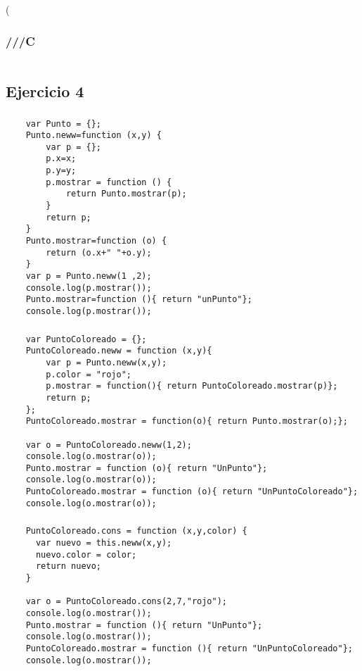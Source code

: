 \left( \documentclass[10pt,a4paper]{article}
\begin{document}
\subsubsection{///C}
    \begin{lstlisting}
    \end{lstlisting}
\subsection{Ejercicio 4}
\subsubsection{}
    \begin{lstlisting}
    var Punto = {};
    Punto.neww=function (x,y) {
    	var p = {};
    	p.x=x;
    	p.y=y;
    	p.mostrar = function () {
	    	return Punto.mostrar(p);
    	}
    	return p;
    }
    Punto.mostrar=function (o) {
    	return (o.x+" "+o.y);
    }
    var p = Punto.neww(1 ,2);
    console.log(p.mostrar());
    Punto.mostrar=function (){ return "unPunto"};
    console.log(p.mostrar());
    \end{lstlisting}

\subsubsection{}
    \begin{lstlisting}
    var PuntoColoreado = {};
    PuntoColoreado.neww = function (x,y){
    	var p = Punto.neww(x,y);
    	p.color = "rojo";
    	p.mostrar = function(){ return PuntoColoreado.mostrar(p)};
    	return p;
    };
    PuntoColoreado.mostrar = function(o){ return Punto.mostrar(o);};
    
    var o = PuntoColoreado.neww(1,2);
	console.log(o.mostrar(o));
    Punto.mostrar = function (o){ return "UnPunto"};
    console.log(o.mostrar(o));
    PuntoColoreado.mostrar = function (o){ return "UnPuntoColoreado"};
    console.log(o.mostrar(o));
    \end{lstlisting}
\subsubsection{}
    \begin{lstlisting}
    PuntoColoreado.cons = function (x,y,color) {
      var nuevo = this.neww(x,y);
      nuevo.color = color;
      return nuevo;
    }

    var o = PuntoColoreado.cons(2,7,"rojo");
    console.log(o.mostrar());
    Punto.mostrar = function (){ return "UnPunto"};
    console.log(o.mostrar());
    PuntoColoreado.mostrar = function (){ return "UnPuntoColoreado"};
    console.log(o.mostrar());
    \end{lstlisting}
\end{document}
